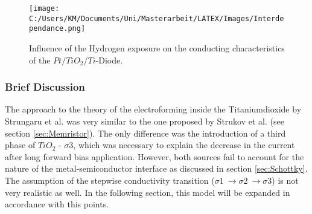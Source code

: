 \documentclass[12pt]{article}
\begin{document}
	\begin{figure}[tbh]
		\centering
			\texttt{[image: C:/Users/KM/Documents/Uni/Masterarbeit/LATEX/Images/Interdependance.png]}
		\caption{Influence of the Hydrogen exposure on the conducting characteristics of the $Pt/TiO_2/Ti$-Diode.}
		\label{fig:Interdependance}
	\end{figure}
	
\subsubsection{Brief Discussion}
	The approach to the theory of the electroforming inside the Titaniumdioxide by Strungaru et al. was very similar to the one proposed by Strukov et al. (see section \ref{sec:Memristor}). The only difference was the introduction of a third phase of $TiO_2$ - $\sigma 3$, which was necessary to explain the decrease in the current after long forward bias application.
	However, both sources fail to account for the nature of the metal-semiconductor interface as discussed in section \ref{sec:Schottky}. The assumption of the stepwise conductivity transition ($\sigma 1\ \rightarrow \sigma 2\ \rightarrow \sigma 3$) is not very realistic as well. In the following section, this model will be expanded in accordance with this points.
	
%
\end{document}

